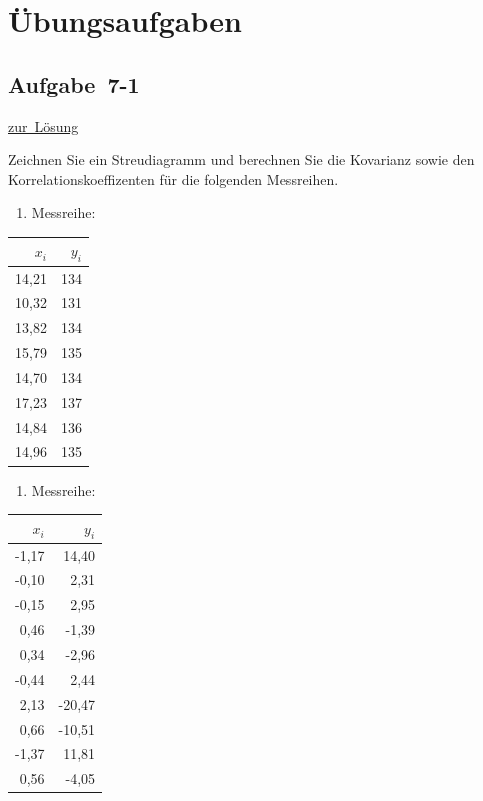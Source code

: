 \documentclass[
  11pt,
  ngerman,
  a4paper,
]{report}
\providecommand{\tightlist}{%
  \setlength{\itemsep}{0pt}\setlength{\parskip}{0pt}}
\begin{document}
\hypertarget{uxfcbungsaufgaben-6}{%
\section*{Übungsaufgaben}\label{uxfcbungsaufgaben-6}}

\hypertarget{aufgabe-7-1}{%
\subsection{Aufgabe~7-1}\label{aufgabe-7-1}}

\protect\hyperlink{loesung-7-1}{zur~Lösung}

Zeichnen Sie ein Streudiagramm und berechnen Sie die Kovarianz sowie den Korrelationskoeffizenten für die folgenden Messreihen.

\begin{enumerate}
\def\labelenumi{\alph{enumi})}
\tightlist
\item
  Messreihe:
\end{enumerate}

\begin{table}[H]
\centering
\begin{tabular}{rr}
\toprule
\textbf{$x_i$} & \textbf{$y_i$}\\
\midrule
14,21 & 134\\
10,32 & 131\\
13,82 & 134\\
15,79 & 135\\
14,70 & 134\\
17,23 & 137\\
14,84 & 136\\
14,96 & 135\\
\bottomrule
\end{tabular}
\end{table}

\begin{enumerate}
\def\labelenumi{\alph{enumi})}
\setcounter{enumi}{1}
\tightlist
\item
  Messreihe:
\end{enumerate}

\begin{table}[H]
\centering
\begin{tabular}{rr}
\toprule
\textbf{$x_i$} & \textbf{$y_i$}\\
\midrule
-1,17 & 14,40\\
-0,10 & 2,31\\
-0,15 & 2,95\\
0,46 & -1,39\\
0,34 & -2,96\\
-0,44 & 2,44\\
2,13 & -20,47\\
0,66 & -10,51\\
-1,37 & 11,81\\
0,56 & -4,05\\
\bottomrule
\end{tabular}
\end{table}
\end{document}
